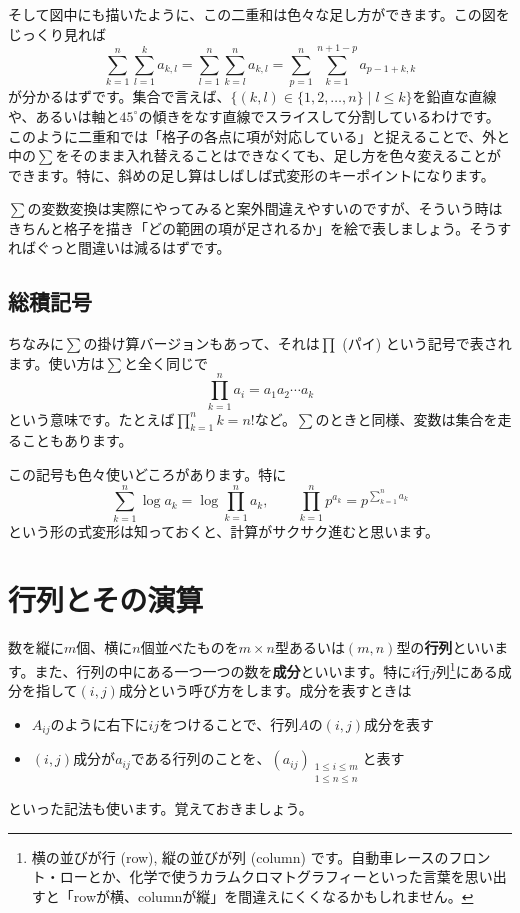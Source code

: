 そして図中にも描いたように、この二重和は色々な足し方ができます。この図をじっくり見れば
\[
\sum_{k = 1}^n \sum_{l = 1}^k a_{k, l}
= \sum_{l = 1}^n \sum_{k = l}^n a_{k, l}
= \sum_{p = 1}^n \sum_{k = 1}^{n + 1 - p} a_{p - 1 + k, k}
\]
が分かるはずです。集合で言えば、$\{(k,l)\in\{1,2,\ldots,n\} \mid l \leq k\}$を鉛直な直線や、あるいは軸と$45^{\circ}$の傾きをなす直線でスライスして分割しているわけです。このように二重和では「格子の各点に項が対応している」と捉えることで、外と中の$\sum$をそのまま入れ替えることはできなくても、足し方を色々変えることができます。特に、斜めの足し算はしばしば式変形のキーポイントになります。

$\sum$の変数変換は実際にやってみると案外間違えやすいのですが、そういう時はきちんと格子を描き「どの範囲の項が足されるか」を絵で表しましょう。そうすればぐっと間違いは減るはずです。

\subsection{総積記号}
ちなみに$\sum$の掛け算バージョンもあって、それは$\prod$ (パイ) という記号で表されます。使い方は$\sum$と全く同じで
\[
\prod_{k = 1}^n a_i = a_1 a_2 \cdots a_k
\]
という意味です。たとえば$\prod_{k = 1}^n k = n!$など。$\sum$のときと同様、変数は集合を走ることもあります。

この記号も色々使いどころがあります。特に
\[
\sum_{k = 1}^n \log a_k = \log \prod_{k = 1}^n a_k, \qquad \prod_{k = 1}^n p^{a_k} = p^{\sum_{k = 1}^n a_k}
\]
という形の式変形は知っておくと、計算がサクサク進むと思います。

\section{行列とその演算}

数を縦に$m$個、横に$n$個並べたものを$m\times n$型あるいは$(m, n)$型の\textbf{行列}といいます。また、行列の中にある一つ一つの数を\textbf{成分}といいます。特に$i$行$j$列\footnote{横の並びが行 (row), 縦の並びが列 (column) です。自動車レースのフロント・ローとか、化学で使うカラムクロマトグラフィーといった言葉を思い出すと「rowが横、columnが縦」を間違えにくくなるかもしれません。}にある成分を指して$(i,j)$成分という呼び方をします。成分を表すときは
\begin{itemize}
\item $A_{ij}$のように右下に$ij$をつけることで、行列$A$の$(i, j)$成分を表す
\item $(i, j)$成分が$a_{ij}$である行列のことを、$(a_{ij})_{\substack{1\leq i\leq m\\ 1\leq n\leq n}}$と表す
\end{itemize}
といった記法も使います。覚えておきましょう。

